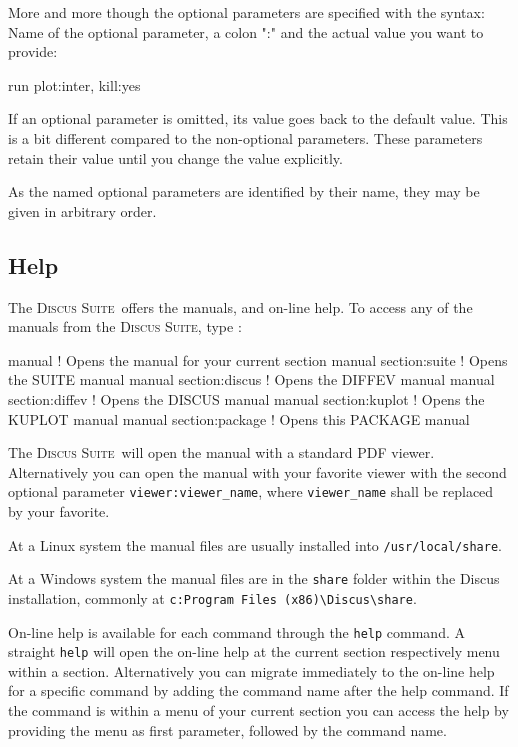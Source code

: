 \documentclass[11pt]{report}
\newcommand{\Suite}{\textsc{Discus Suite\ }}
\newcommand{\suite}{\textsc{Discus Suite}}
\begin{document}
More and more though the optional parameters are specified with the
syntax: Name of the optional parameter, a colon ":" and the actual
value you want to provide:
\begin{MacVerbatim}
 run  plot:inter, kill:yes
\end{MacVerbatim}
If an optional parameter is omitted, its value goes back to the
default value. This is a bit different compared to the
non-optional parameters. These parameters retain their value
until you change the value explicitly.

As the named optional parameters are identified by their name,
they may be given in arbitrary order.


\subsection{Help} \label{over-help}

The \Suite offers the manuals, and on-line help. To access any of the 
manuals from the \suite, type :
\begin{MacVerbatim}
  manual                 ! Opens the manual for your current section
  manual section:suite   ! Opens the SUITE manual
  manual section:discus  ! Opens the DIFFEV manual
  manual section:diffev  ! Opens the DISCUS manual
  manual section:kuplot  ! Opens the KUPLOT manual
  manual section:package ! Opens this PACKAGE manual
\end{MacVerbatim}

The \Suite will open the manual with a standard PDF viewer. Alternatively
you can open the manual with your favorite viewer with the second 
optional parameter {\tt viewer:viewer\_name}, where {\tt viewer\_name} 
shall be replaced by your favorite.

At a Linux system the manual files are usually installed into 
{\tt /usr/local/share}.

At a Windows system the manual files are in the {\tt share} folder 
within the Discus installation, commonly at
{\tt c:Program Files (x86)\textbackslash Discus\textbackslash share}.  

On-line help is available for each command through the {\tt help}
command. A straight {\tt help} will open the on-line help at the
current section respectively menu within a section. Alternatively
you can migrate immediately to the on-line help for a specific 
command by adding the command name after the help command. If 
the command is within a menu of your current section you can 
access the help by providing the menu as first parameter, followed
by the command name.
\end{document}
